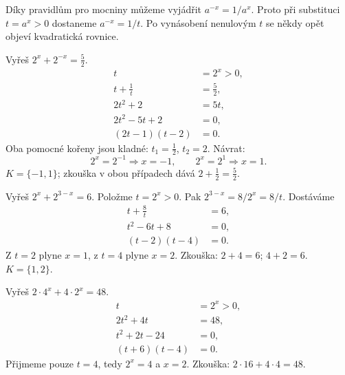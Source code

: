 \documentclass[11pt,a4paper]{article}
\begin{document}
Díky pravidlům pro mocniny můžeme vyjádřit $a^{-x}=1/a^x$. Proto při substituci $t=a^x>0$ dostaneme $a^{-x}=1/t$. Po vynásobení nenulovým $t$ se někdy opět objeví kvadratická rovnice.
\begin{prikladReseniBox}[title={Příklad 1}]
Vyřeš $2^x+2^{-x}=\frac52$.
\tcblower
\[\begin{aligned}t&=2^x>0,\\t+\frac1t&=\frac52,\\2t^2+2&=5t,\\2t^2-5t+2&=0,\\(2t-1)(t-2)&=0.\end{aligned}\]
Oba pomocné kořeny jsou kladné: $t_1=\frac12$, $t_2=2$. Návrat:
\[2^x=2^{-1}\Rightarrow x=-1,\qquad2^x=2^1\Rightarrow x=1.\]
$K=\{-1,1\}$; zkouška v obou případech dává $2+\frac12=\frac52$.
\end{prikladReseniBox}
\begin{prikladReseniBox}[title={Příklad 2}]
Vyřeš $2^x+2^{3-x}=6$.
\tcblower
Položme $t=2^x>0$. Pak $2^{3-x}=8/2^x=8/t$. Dostáváme
\[\begin{aligned}t+\frac8t&=6,\\t^2-6t+8&=0,\\(t-2)(t-4)&=0.\end{aligned}\]
Z $t=2$ plyne $x=1$, z $t=4$ plyne $x=2$. Zkouška: $2+4=6$; $4+2=6$. $K=\{1,2\}$.
\end{prikladReseniBox}
\begin{prikladReseniBox}[title={Příklad 3}]
Vyřeš $2\cdot4^x+4\cdot2^x=48$.
\tcblower
\[\begin{aligned}t&=2^x>0,\\2t^2+4t&=48,\\t^2+2t-24&=0,\\(t+6)(t-4)&=0.\end{aligned}\]
Přijmeme pouze $t=4$, tedy $2^x=4$ a $x=2$. Zkouška: $2\cdot16+4\cdot4=48$.
\end{prikladReseniBox}
\end{document}
